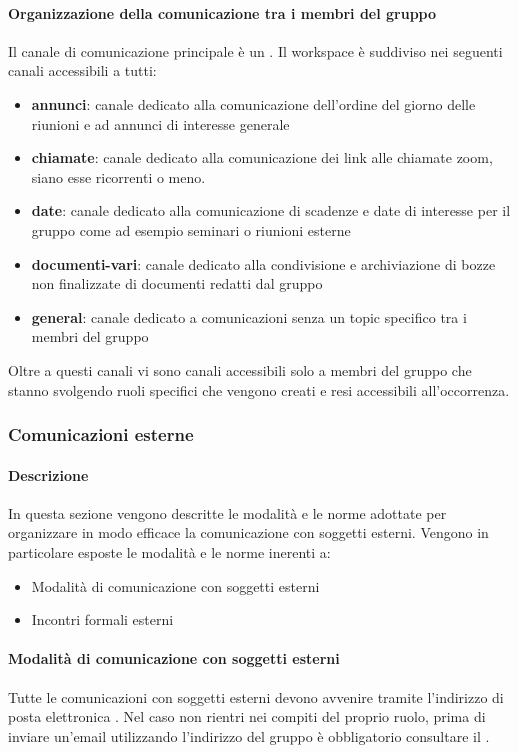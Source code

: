 \paragraph{Organizzazione della comunicazione tra i membri del gruppo}
Il canale di comunicazione principale è un  .
Il workspace è suddiviso nei seguenti canali accessibili a tutti:
\begin{itemize}
\item \textbf{annunci}: canale dedicato alla comunicazione dell'ordine del giorno delle riunioni e ad annunci di interesse generale
\item \textbf{chiamate}: canale dedicato alla comunicazione dei link alle chiamate zoom, siano esse ricorrenti o meno.
\item \textbf{date}: canale dedicato alla comunicazione di scadenze e date di interesse per il gruppo come ad esempio seminari o riunioni esterne
\item \textbf{documenti-vari}: canale dedicato alla condivisione e archiviazione di bozze non finalizzate di documenti redatti dal gruppo
\item \textbf{general}: canale dedicato a comunicazioni senza un topic specifico tra i membri del gruppo
\end{itemize}
Oltre a questi canali vi sono canali accessibili solo a membri del gruppo che stanno svolgendo ruoli specifici che vengono creati e resi accessibili all'occorrenza.
\subsubsection{Comunicazioni esterne}
\paragraph{Descrizione}
In questa sezione vengono descritte le modalità e le norme adottate per organizzare in modo efficace la comunicazione con soggetti esterni.
Vengono in particolare esposte le modalità e le norme inerenti a:
\begin{itemize}
\item Modalità di comunicazione con soggetti esterni
\item Incontri formali esterni
\end{itemize}
\paragraph{Modalità di comunicazione con soggetti esterni}
Tutte le comunicazioni con soggetti esterni devono avvenire tramite l'indirizzo di posta elettronica \emailgruppo{}. Nel caso non rientri nei compiti del proprio ruolo, prima di inviare un'email utilizzando l'indirizzo del gruppo è obbligatorio consultare il \RdP{}.
